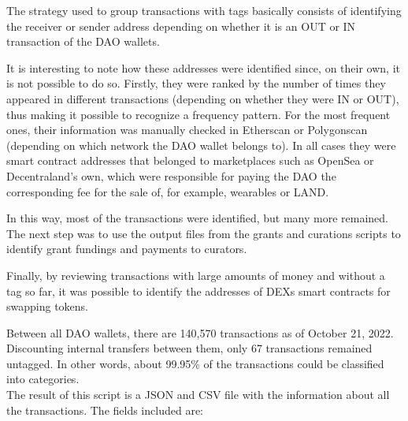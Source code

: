 \documentclass[MSE,Master,english]{twbook}%
\begin{document}
The strategy used to group transactions with tags basically consists of identifying the receiver or sender address depending on whether it is an OUT or IN transaction of the \gls{DAO} wallets.

It is interesting to note how these addresses were identified since, on their own, it is not possible to do so. Firstly, they were ranked by the number of times they appeared in different transactions (depending on whether they were IN or OUT), thus making it possible to recognize a frequency pattern. For the most frequent ones, their information was manually checked in Etherscan\cite{etherscan} or Polygonscan\cite{polygonscan} (depending on which network the \gls{DAO} wallet belongs to). In all cases they were smart contract addresses that belonged to marketplaces such as OpenSea\cite{opensea} or Decentraland's own\cite{DCLMarket}, which were responsible for paying the \gls{DAO} the corresponding fee for the sale of, for example, wearables or \gls{LAND}.

In this way, most of the transactions were identified, but many more remained. The next step was to use the output files from the grants and curations scripts to identify grant fundings and payments to curators.

Finally, by reviewing transactions with large amounts of money and without a tag so far, it was possible to identify the addresses of \ac{DEXs} smart contracts for swapping tokens.

Between all \gls{DAO} wallets, there are 140,570 transactions as of October 21, 2022. Discounting internal transfers between them, only 67 transactions remained untagged. In other words, about 99.95\% of the transactions could be classified into categories. \\

The result of this script is a JSON and CSV file with the information about all the transactions. The fields included are:
\end{document}
